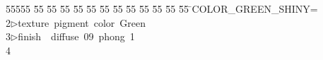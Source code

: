 %
%
\begin{tabbing}
55555 \= 55 \= 55 \= 55 \= 55 \= 55 \= 55 \= 55 \= 55 \= 55 \= 55 \= 55 \= 55 \= \>COLOR\_GREEN\_SHINY=\\[0pt]
2\>$\triangleright$\>texture\ pigment\ color\ Green\ \ \\[0pt]
3\>$\triangleright$\>finish\ \ diffuse\ 09\ phong\ 1\\[0pt]
4\>\end{tabbing}
